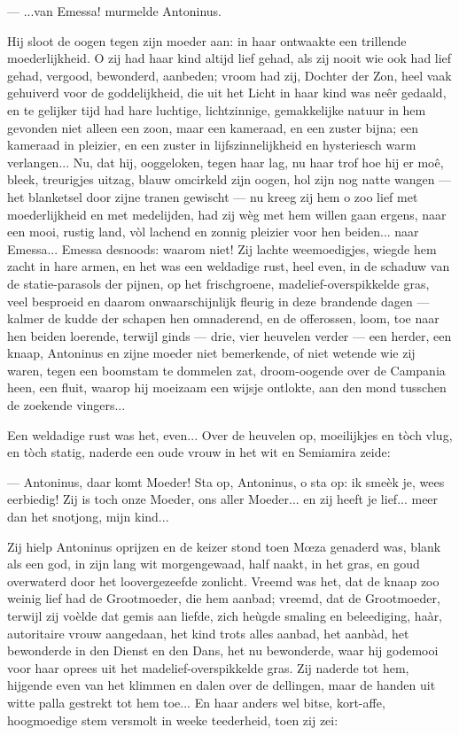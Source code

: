 \documentclass[a4paper, 12pt, oneside, dutch]{article}
\begin{document}
--- ...van Emessa! murmelde Antoninus.

Hij sloot de oogen tegen zijn moeder aan: in haar ontwaakte een trillende moederlijkheid. O zij had haar kind altijd lief gehad, als zij nooit wie ook had lief gehad, vergood, bewonderd, aanbeden; vroom had zij, Dochter der Zon, heel vaak gehuiverd voor de goddelijkheid, die uit het Licht in haar kind was neêr gedaald, en te gelijker tijd had hare luchtige, lichtzinnige, gemakkelijke natuur in hem gevonden niet alleen een zoon, maar een kameraad, en een zuster bijna; een kameraad in pleizier, en een zuster in lijfszinnelijkheid en hysteriesch warm verlangen... Nu, dat hij, ooggeloken, tegen haar lag, nu haar trof hoe hij er moê, bleek, treurigjes uitzag, blauw omcirkeld zijn oogen, hol zijn nog natte wangen --- het blanketsel door zijne tranen gewischt --- nu kreeg zij hem o zoo lief met moederlijkheid en met medelijden, had zij wèg met hem willen gaan ergens, naar een mooi, rustig land, vòl lachend en zonnig pleizier voor hen beiden... naar Emessa... Emessa desnoods: waarom niet! Zij lachte weemoedigjes, wiegde hem zacht in hare armen, en het was een weldadige rust, heel even, in de schaduw van de statie-parasols der pijnen, op het frischgroene, madelief-overspikkelde gras, veel besproeid en daarom onwaarschijnlijk fleurig in deze brandende dagen --- kalmer de kudde der schapen hen omnaderend, en de offerossen, loom, toe naar hen beiden loerende, terwijl ginds --- drie, vier heuvelen verder --- een herder, een knaap, Antoninus en zijne moeder niet bemerkende, of niet wetende wie zij waren, tegen een boomstam te dommelen zat, droom-oogende over de Campania heen, een fluit, waarop hij moeizaam een wijsje ontlokte, aan den mond tusschen de zoekende vingers...

Een weldadige rust was het, even... Over de heuvelen op, moeilijkjes en tòch vlug, en tòch statig, naderde een oude vrouw in het wit en Semiamira zeide:

--- Antoninus, daar komt Moeder! Sta op, Antoninus, o sta op: ik smeèk je, wees eerbiedig! Zij is toch onze Moeder, ons aller Moeder... en zij heeft je lief... meer dan het snotjong, mijn kind...

Zij hielp Antoninus oprijzen en de keizer stond toen Mœza genaderd was, blank als een god, in zijn lang wit morgengewaad, half naakt, in het gras, en goud overwaterd door het loovergezeefde zonlicht. Vreemd was het, dat de knaap zoo weinig lief had de Grootmoeder, die hem aanbad; vreemd, dat de Grootmoeder, terwijl zij voèlde dat gemis aan liefde, zich heùgde smaling en beleediging, haàr, autoritaire vrouw aangedaan, het kind trots alles aanbad, het aanbàd, het bewonderde in den Dienst en den Dans, het nu bewonderde, waar hij godemooi voor haar oprees uit het madelief-overspikkelde gras. Zij naderde tot hem, hijgende even van het klimmen en dalen over de dellingen, maar de handen uit witte palla gestrekt tot hem toe... En haar anders wel bitse, kort-affe, hoogmoedige stem versmolt in weeke teederheid, toen zij zei:
\end{document}

